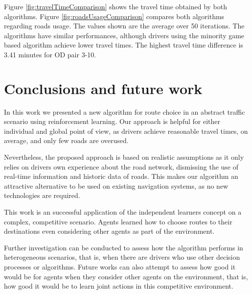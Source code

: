 \documentclass[12pt]{llncs}
\begin{document}
Figure \ref{fig:travelTimeComparison} shows the travel time obtained by both algorithms. Figure \ref{fig:roadsUsageComparison} compares both algorithms regarding roads usage. The values shown are the average over 50 iterations. The algorithms have similar performances, although drivers using the minority game based algorithm achieve lower travel times. The highest travel time difference is 3.41 minutes for OD pair 3-10.



\section{Conclusions and future work}
\label{sec:conclusions}

In this work we presented a new algorithm for route choice in an abstract traffic scenario using reinforcement learning. Our approach is helpful for either individual and global point of view, as drivers achieve reasonable travel times, on average, and only few roads are overused.

Nevertheless, the proposed approach is based on realistic assumptions as it only relies on drivers own experience about the road network, dismissing the use of real-time information and historic data of roads. This makes our algorithm an attractive alternative to be used on existing navigation systems, as no new technologies are required.

This work is an successful application of the independent learners concept on a complex, competitive scenario. Agents learned how to choose routes to their destinations even considering other agents as part of the environment.

Further investigation can be conducted to assess how the algorithm performs in heterogeneous scenarios, that is, when there are drivers who use other decision processes or algorithms. Future works can also attempt to assess how good it would be for agents when they consider other agents on the environment, that is, how good it would be to learn joint actions in this competitive environment.


 
\end{document}
